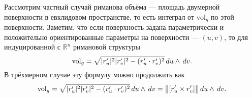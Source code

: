 Рассмотрим частный случай риманова объёма --- площадь двумерной поверхности в евклидовом пространстве, то есть интеграл от $\text{vol}_g$ по этой поверхности. Заметим, что если поверхность задана параметрически и положительно ориентированные параметры на поверхности --- $(u,v)$, то для индуцированной с $\mathbb{R}^n$ римановой структуры
\begin{equation*}
	\text{vol}_g = \sqrt{|r_u'|^2 |r_v'|^2 - (r_u' \cdot r_v')^2} \, d u \wedge \, d v.
\end{equation*}
В трёхмерном случае эту формулу можно продолжить как
\begin{equation*}
	\text{vol}_g = \sqrt{|r_u'|^2 |r_v'|^2 - (r_u' \cdot r_v')^2} \, d u \wedge \, d v = \big\|[r_u' \times r_v']\big\| \, d u \wedge \, d v.
\end{equation*}